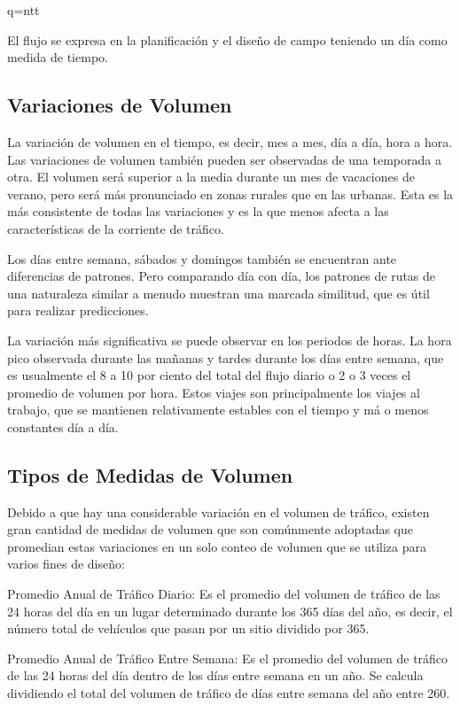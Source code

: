 \documentclass[final,fmstyle]{fpunathesis}
\begin{document}
q=ntt

El flujo se expresa en la planificación y el diseño de campo teniendo un día como medida de tiempo.

\subsection{Variaciones de Volumen}

La variación de volumen en el tiempo, es decir, mes a mes, día a día, hora a hora. Las variaciones de volumen también pueden ser observadas de una temporada a otra. El volumen será superior a la media durante un mes de vacaciones de verano, pero será más pronunciado en zonas rurales que en las urbanas. Esta es la más consistente de todas las variaciones y es la que menos afecta a las características de la corriente de tráfico.

Los días entre semana, sábados y domingos también se encuentran ante diferencias de patrones. Pero comparando día con día, los patrones de rutas de una naturaleza similar a menudo muestran una marcada similitud, que es útil para realizar predicciones.

La variación más significativa se puede observar en los periodos de horas. La hora pico observada durante las mañanas y tardes durante los días entre semana, que es usualmente el 8 a 10 por ciento del total del flujo diario o 2 o 3 veces el promedio de volumen por hora. Estos viajes son principalmente los viajes al trabajo, que se mantienen relativamente estables con el tiempo y má o menos constantes día a día.

\subsection{Tipos de Medidas de Volumen}

Debido a que hay una considerable variación en el volumen de tráfico, existen gran cantidad de medidas de volumen que son comúnmente adoptadas que promedian estas variaciones en un solo conteo de volumen que se utiliza para varios fines de diseño:

Promedio Anual de Tráfico Diario: Es el promedio del volumen de tráfico de las 24 horas del día en un lugar determinado durante los 365 días del año, es decir, el número total de vehículos que pasan por un sitio dividido por 365.

Promedio Anual de Tráfico Entre Semana: Es el promedio del volumen de tráfico de las 24 horas del día dentro de los días entre semana en un año. Se calcula dividiendo el total del volumen de tráfico de días entre semana del año entre 260.
\end{document}
